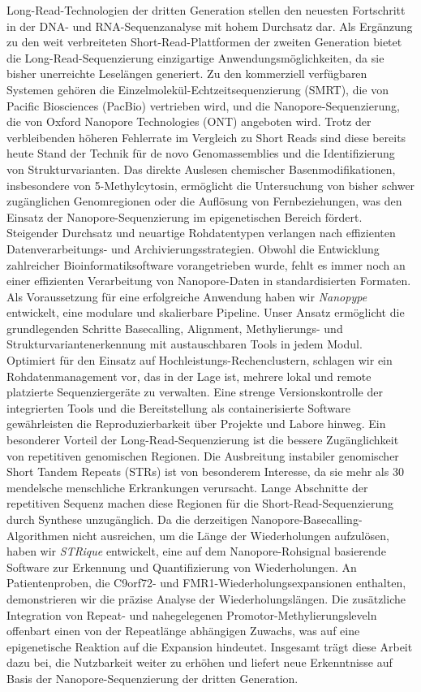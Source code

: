 Long-Read-Technologien der dritten Generation stellen den neuesten Fortschritt in der DNA- und RNA-Sequenzanalyse mit hohem Durchsatz dar.
Als Ergänzung zu den weit verbreiteten Short-Read-Plattformen der zweiten Generation bietet die Long-Read-Sequenzierung einzigartige Anwendungsmöglichkeiten, da sie bisher unerreichte Leselängen generiert.
Zu den kommerziell verfügbaren Systemen gehören die Einzelmolekül-Echtzeitsequenzierung (SMRT), die von Pacific Biosciences (PacBio) vertrieben wird, und die Nanopore-Sequenzierung, die von Oxford Nanopore Technologies (ONT) angeboten wird.
Trotz der verbleibenden höheren Fehlerrate im Vergleich zu Short Reads sind diese bereits heute Stand der Technik für de novo Genomassemblies und die Identifizierung von Strukturvarianten.
Das direkte Auslesen chemischer Basenmodifikationen, insbesondere von 5-Methylcytosin, ermöglicht die Untersuchung von bisher schwer zugänglichen Genomregionen oder die Auflösung von Fernbeziehungen, was den Einsatz der Nanopore-Sequenzierung im epigenetischen Bereich fördert.
Steigender Durchsatz und neuartige Rohdatentypen verlangen nach effizienten Datenverarbeitungs- und Archivierungsstrategien.
Obwohl die Entwicklung zahlreicher Bioinformatiksoftware vorangetrieben wurde, fehlt es immer noch an einer effizienten Verarbeitung von Nanopore-Daten in standardisierten Formaten.
Als Voraussetzung für eine erfolgreiche Anwendung haben wir \textit{Nanopype} entwickelt, eine modulare und skalierbare Pipeline. 
Unser Ansatz ermöglicht die grundlegenden Schritte Basecalling, Alignment, Methylierungs- und Strukturvariantenerkennung mit austauschbaren Tools in jedem Modul.
Optimiert für den Einsatz auf Hochleistungs-Rechenclustern, schlagen wir ein Rohdatenmanagement vor, das in der Lage ist, mehrere lokal und remote platzierte Sequenziergeräte zu verwalten.
Eine strenge Versionskontrolle der integrierten Tools und die Bereitstellung als containerisierte Software gewährleisten die Reproduzierbarkeit über Projekte und Labore hinweg.
Ein besonderer Vorteil der Long-Read-Sequenzierung ist die bessere Zugänglichkeit von repetitiven genomischen Regionen.
Die Ausbreitung instabiler genomischer Short Tandem Repeats (STRs) ist von besonderem Interesse, da sie mehr als 30 mendelsche menschliche Erkrankungen verursacht.
Lange Abschnitte der repetitiven Sequenz machen diese Regionen für die Short-Read-Sequenzierung durch Synthese unzugänglich.
Da die derzeitigen Nanopore-Basecalling-Algorithmen nicht ausreichen, um die Länge der Wiederholungen aufzulösen, haben wir \textit{STRique} entwickelt, eine auf dem Nanopore-Rohsignal basierende Software zur Erkennung und Quantifizierung von Wiederholungen.
An Patientenproben, die C9orf72- und FMR1-Wiederholungsexpansionen enthalten, demonstrieren wir die präzise Analyse der Wiederholungslängen.
Die zusätzliche Integration von Repeat- und nahegelegenen Promotor-Methylierungsleveln offenbart einen von der Repeatlänge abhängigen Zuwachs, was auf eine epigenetische Reaktion auf die Expansion hindeutet.
Insgesamt trägt diese Arbeit dazu bei, die Nutzbarkeit weiter zu erhöhen und liefert neue Erkenntnisse auf Basis der Nanopore-Sequenzierung der dritten Generation.


